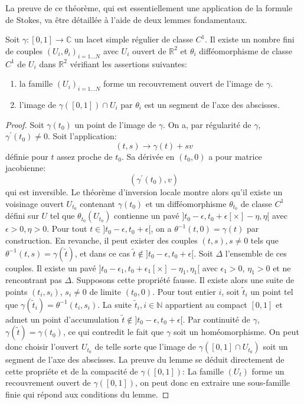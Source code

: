 La preuve de ce théorème, qui est essentiellement une application de la formule
de Stokes, va être détaillée à l'aide de deux lemmes fondamentaux.
\begin{lemme}
Soit $\gamma \colon [0,1] \to \mathbb{C}$ un lacet simple régulier de
classe $C^1$. Il existe un nombre fini de couples $(U_i, \theta_i)_{i=1\dots N}$ avec $U_i$
ouvert de $\mathbb{R}^2$ et $\theta_i$ difféomorphisme de classe $C^1$ de $U_i$
dans $\mathbb{R}^2$ vérifiant les assertions suivantes:
\begin{enumerate}
  \item la famille $(U_i)_{i=1\dots N}$ forme un recouvrement ouvert de l'image
  de $\gamma$.
  \item l'image de $\gamma([0,1])\cap U_i$ par $\theta_i$ est un segment de
  l'axe des abscisses.
\end{enumerate}
\end{lemme}
\begin{proof}
Soit $\gamma(t_0)$ un point de l'image de $\gamma$. On a, par régularité de
$\gamma$,  $\gamma^\prime(t_0) \neq 0$. 
Soit l'application:
\[
(t,s) \to \gamma(t) + s v
\]
définie pour $t$ assez proche de $t_0$. Sa dérivée en $(t_0,0)$ a pour matrice
jacobienne:
\[
\left(
\gamma^\prime(t_0), v
\right)
\]
qui est inversible. Le théorème d'inversion locale montre alors qu'il existe un
voisinage ouvert $U_{t_0}$ contenant $\gamma(t_0)$ et un difféomorphisme
$\theta_{t_0}$ de classe $C^1$ défini sur $U$ tel que $\theta_{t_0}(U_{t_0})$
contienne un pavé $]t_0-\epsilon, t_0+\epsilon[ \times ]-\eta, \eta[$ avec
$\epsilon >0, \eta > 0$. Pour tout $t \in ]t_0-\epsilon, t_0+\epsilon[$, on a
$\theta^{-1}(t,0)=\gamma(t)$ par construction. En revanche, il peut exister des
couples $(t,s), s \neq 0$ tels que $\theta^{-1}(t,s)=\gamma(\tilde{t})$, et dans
ce cas $\tilde{t} \notin ]t_0-\epsilon, t_0+\epsilon[$. Soit $\Delta$ l'ensemble
de ces couples. Il existe un pavé $]t_0-\epsilon_1, t_0+\epsilon_1[ \times
]-\eta_1, \eta_1[$ avec $\epsilon_1 > 0$, $\eta_1 > 0$ et ne rencontrant pas
$\Delta$. Supposons cette propriété fausse. Il existe alors une suite de points
$(t_i,s_i)$, $s_i \neq 0$ de limite $(t_0,0)$. Pour tout entier $i$, soit
$\tilde{t}_i$ un point tel que $\gamma(\tilde{t}_i)=\theta^{-1}(t_i,s_i)$. La
suite $\tilde{t}_i, i\in \mathbb{N}$ appartient au compact $[0,1]$ et admet un point
d'accumulation $\tilde{t} \notin ]t_0-\epsilon, t_0+\epsilon[$. Par continuité
de $\gamma$, $\gamma(\tilde{t})=\gamma(t_0)$, ce qui contredit le fait que
$\gamma$ soit un homéomorphisme. On peut donc choisir l'ouvert $U_{t_0}$ de
telle sorte que l'image de $\gamma([0,1]\cap U_{t_0})$ soit un segment de l'axe
des abscisses.
La preuve du lemme se déduit directement de cette propriéte et de la compacité
de $\gamma([0,1])$: La famille $(U_t)$ forme un recouvrement ouvert de
$\gamma([0,1])$, on peut donc en extraire une sous-famille finie qui répond aux
conditions du lemme.
\end{proof}
